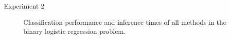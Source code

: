 \documentclass[english]{beamer}
\begin{document}
\begin{frame}
\begin{columns}[t]
\begin{block}{ Experiment 2}
\begin{figure}[t]
  \centering
  \caption{Classification performance and inference times of all methods in the 
  binary logistic regression problem. 
  }
  \label{fig:logistic_performance}
\end{figure}




\end{block}
\end{columns}
\end{frame}
\end{document}
